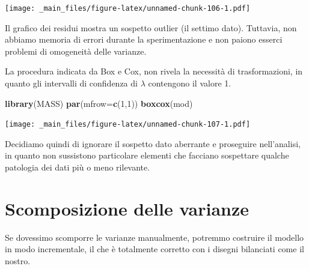 \documentclass[a4paper,12pt,oneside]{book}
\newenvironment{Shaded}{\begin{snugshade}}{\end{snugshade}}
\newcommand{\KeywordTok}[1]{\textcolor[rgb]{0.13,0.29,0.53}{\textbf{#1}}}
\newcommand{\DataTypeTok}[1]{\textcolor[rgb]{0.13,0.29,0.53}{#1}}
\newcommand{\DecValTok}[1]{\textcolor[rgb]{0.00,0.00,0.81}{#1}}
\newcommand{\NormalTok}[1]{#1}
\theoremstyle{definition}
\theoremstyle{definition}
\theoremstyle{definition}
\theoremstyle{remark}
\begin{document}
\texttt{[image: \_main\_files/figure-latex/unnamed-chunk-106-1.pdf]}

Il grafico dei residui mostra un sospetto outlier (il settimo dato).
Tuttavia, non abbiamo memoria di errori durante la sperimentazione e non
paiono esserci problemi di omogeneità delle varianze.

La procedura indicata da Box e Cox, non rivela la necessità di
trasformazioni, in quanto gli intervalli di confidenza di \(\lambda\)
contengono il valore 1.

\begin{Shaded}
\begin{Highlighting}[]
\KeywordTok{library}\NormalTok{(MASS)}
\KeywordTok{par}\NormalTok{(}\DataTypeTok{mfrow=}\KeywordTok{c}\NormalTok{(}\DecValTok{1}\NormalTok{,}\DecValTok{1}\NormalTok{))}
\KeywordTok{boxcox}\NormalTok{(mod)}
\end{Highlighting}
\end{Shaded}

\texttt{[image: \_main\_files/figure-latex/unnamed-chunk-107-1.pdf]}

Decidiamo quindi di ignorare il sospetto dato aberrante e proseguire
nell'analisi, in quanto non sussistono particolare elementi che facciano
sospettare qualche patologia dei dati più o meno rilevante.

\section{Scomposizione delle
varianze}\label{scomposizione-delle-varianze}

Se dovessimo scomporre le varianze manualmente, potremmo costruire il
modello in modo incrementale, il che è totalmente corretto con i disegni
bilanciati come il nostro.
\end{document}

